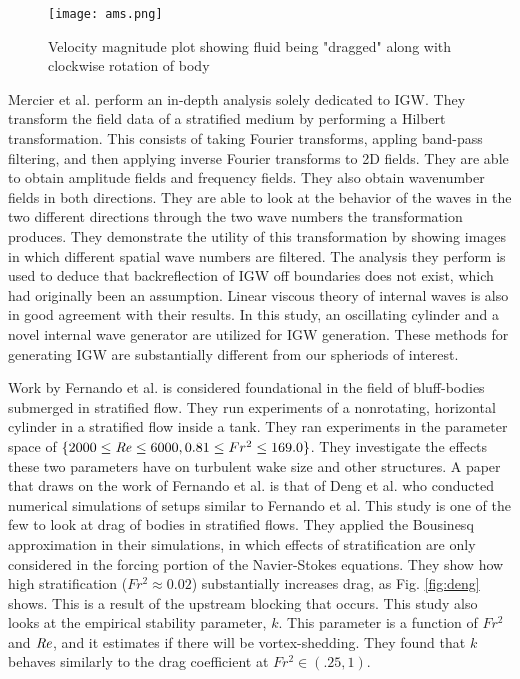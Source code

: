 \begin{figure}[htbp]
\centering
\texttt{[image: ams.png]}
\caption{Velocity magnitude plot showing fluid being "dragged" along with clockwise rotation of body \cite{mittal_direct_2020}}
\label{fig:ams}
\end{figure}

Mercier et al. \cite{mercier_reflection_2008} perform an in-depth analysis solely dedicated to IGW. They transform the field data of a stratified medium by performing a Hilbert transformation. This consists of taking Fourier transforms, appling band-pass filtering, and then applying inverse Fourier transforms to 2D fields. They are able to obtain amplitude fields and frequency fields. They also obtain wavenumber fields in both directions. They are able to look at the behavior of the waves in the two different directions through the two wave numbers the transformation produces. They demonstrate the utility of this transformation by showing images in which different spatial wave numbers are filtered. The analysis they perform is used to deduce that backreflection of IGW off boundaries does not exist, which had originally been an assumption. Linear viscous theory of internal waves is also in good agreement with their results. In this study, an oscillating cylinder and a novel internal wave generator are utilized for IGW generation. These methods for generating IGW are substantially different from our spheriods of interest. 

Work by Fernando et al. is considered foundational in the field of bluff-bodies submerged in stratified flow. They run experiments of a nonrotating, horizontal cylinder in a stratified flow inside a tank. They ran experiments in the parameter space of $\{2000 \leq \mathit{Re} \leq 6000, 0.81 \leq Fr^2 \leq  169.0\}$. They investigate the effects these two parameters have on turbulent wake size and other structures. A paper that draws on the work of Fernando et al. is that of Deng et al. \cite{deng_drag_2022} who conducted numerical simulations of setups similar to Fernando et al. This study is one of the few to look at drag of bodies in stratified flows. They applied the Bousinesq approximation in their simulations, in which effects of stratification are only considered in the forcing portion of the Navier-Stokes equations. They show how high stratification ($Fr^2 \approx 0.02$) substantially increases drag, as Fig. \ref{fig:deng} shows. This is a result of the upstream blocking that occurs. This study also looks at the empirical stability parameter, $k$. This parameter is a function of $Fr^2$ and $\mathit{Re}$, and it estimates if there will be vortex-shedding. They found that $k$ behaves similarly to the drag coefficient at $Fr^2 \in (.25, 1)$.

